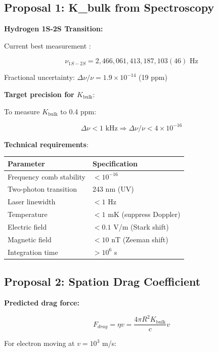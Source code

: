 \documentclass{article}
\begin{document}
\subsection{Proposal 1: K\_bulk from Spectroscopy}

\textbf{Hydrogen 1S-2S Transition:}

Current best measurement \cite{parthey2011improved}:

\begin{equation}
\nu_{1S-2S} = 2{,}466{,}061{,}413{,}187{,}103(46) \text{ Hz}
\end{equation}

Fractional uncertainty: $\Delta \nu/\nu = 1.9 \times 10^{-14}$ (19 ppm)

\textbf{Target precision for $K_{\text{bulk}}$}:

To measure $K_{\text{bulk}}$ to 0.4 ppm:

\begin{equation}
\Delta \nu < 1 \text{ kHz} \Rightarrow \Delta \nu/\nu < 4 \times 10^{-16}
\end{equation}

\textbf{Technical requirements}:

\begin{longtable}{ll}
\toprule
\textbf{Parameter} & \textbf{Specification} \\
\midrule
Frequency comb stability & $< 10^{-16}$ \\
Two-photon transition & 243 nm (UV) \\
Laser linewidth & $< 1$ Hz \\
Temperature & $< 1$ mK (suppress Doppler) \\
Electric field & $< 0.1$ V/m (Stark shift) \\
Magnetic field & $< 10$ nT (Zeeman shift) \\
Integration time & $> 10^6$ s \\
\bottomrule
\end{longtable}

\subsection{Proposal 2: Spation Drag Coefficient}

\textbf{Predicted drag force:}

\begin{equation}
F_{drag} = \eta v = \frac{4\pi R^2 K_{\text{bulk}}}{c} v
\end{equation}

For electron moving at $v = 10^3$ m/s:
\end{document}
